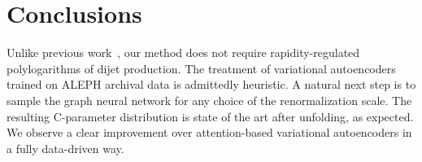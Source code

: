 \section{Conclusions}\label{sec:conclusions}

Unlike previous
work~\cite{TPC:1565-The-Unreasonable-Effectiveness-of-Non-Global-Saddle-Point-Approximations-in-Collider-Phenomenology-September-30-2026},
our method does not require rapidity-regulated polylogarithms of dijet
production. The treatment of variational autoencoders trained on ALEPH
archival data is admittedly heuristic. A natural next step is to sample
the graph neural network for any choice of the renormalization scale.
The resulting C-parameter distribution is state of the art after
unfolding, as expected. We observe a clear improvement over
attention-based variational autoencoders in a fully data-driven way.

